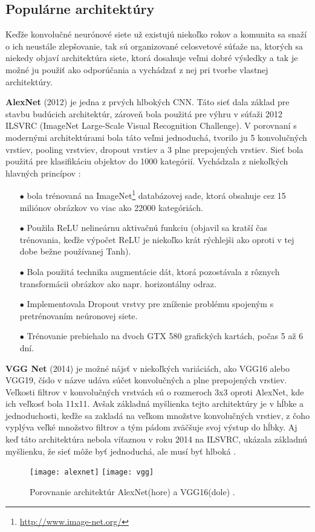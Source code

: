 \subsection{Populárne architektúry}
\label{subsec:popularCNN}
Keďže konvolučné neurónové siete už existujú niekoľko rokov a komunita sa snaží o ich neustále zlepšovanie, tak sú organizované
    celosvetové súťaže na, ktorých sa niekedy objaví architektúra siete, ktorá dosahuje veľmi dobré výsledky a tak je možné ju použiť ako odporúčania a
    vychádzať z nej pri tvorbe vlastnej architektúry.

\textbf{AlexNet} (2012) je jedna z prvých hlbokých CNN. Táto sieť dala základ pre stavbu budúcich architektúr, zároveň bola použitá
    pre výhru v súťaži 2012 ILSVRC (ImageNet Large-Scale Visual Recognition Challenge).
V porovnaní s modernými architektúrami bola táto veľmi jednoduchá, tvorilo ju 5 konvolučných vrstiev, pooling vrstviev, dropout vrstiev a 3 plne prepojených vrstiev.
Sieť bola použitá pre klasifikáciu objektov do 1000 kategórií.
Vychádzala z niekoľkých hlavných princípov \cite{odkaz:PopularCNN}:
\begin{enumerate}
    \item[$\bullet$] bola trénovaná na ImageNet\footnote{\url{http://www.image-net.org/}} databázovej sade, ktorá obsahuje cez 15 miliónov obrázkov vo viac ako 22000 kategóriách.
    \item[$\bullet$] Použila ReLU nelineárnu aktivačnú funkciu (objavil sa kratší čas trénovania, keďže výpočet ReLU je niekoľko krát rýchlejši ako oproti v tej dobe bežne používanej Tanh).
    \item[$\bullet$] Bola použitá technika augmentácie dát, ktorá pozostávala z rôznych transformácii obrázkov ako napr. horizontálny odraz.
    \item[$\bullet$] Implementovala Dropout vrstvy pre zníženie problému spojeným s pretrénovaním neúronovej siete.
    \item[$\bullet$] Trénovanie prebiehalo na dvoch GTX 580 grafických kartách, počas 5 až 6 dní.
\end{enumerate}

\textbf{VGG Net} (2014) je možné nájsť v niekoľkých variáciách, ako VGG16 alebo VGG19, číslo v názve udáva súčet konvolučných a plne prepojených vrstiev.
Veľkosti filtrov v konvolučných vrstvách sú o rozmeroch 3x3 oproti AlexNet, kde ich veľkosť bola 11x11.
Avšak základná myšlienka tejto architektúry je v hĺbke a jednoduchosti, keďže sa zakladá na veľkom množstve konvolučných vrstiev, z čoho vyplýva
    veľké množstvo filtrov a tým pádom zväčšuje svoj výstup do hĺbky.
Aj keď táto architektúra nebola víťaznou v roku 2014 na ILSVRC, ukázala základnú myšlienku, že sieť môže byť jednoduchá, ale musí byť hlboká \cite{odkaz:PopularCNN}.

\begin{figure}[H]
    \centering
    \texttt{[image: alexnet]}
    \qquad
    \texttt{[image: vgg]}
    \caption{Porovnanie architektúr AlexNet(hore) \cite{odkaz:AlexNet} a VGG16(dole) \cite{odkaz:VGG16}.}
    \label{pic:PopularCNN}
\end{figure}
